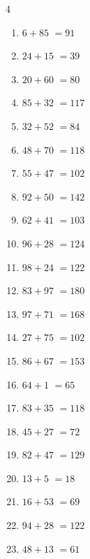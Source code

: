 \begin{multicols}{4}
\begin{enumerate}
  \item $6+85$
        $=91$

  \item $24+15$
        $=39$

  \item $20+60$
        $=80$

  \item $85+32$
        $=117$

  \item $32+52$
        $=84$

  \item $48+70$
        $=118$

  \item $55+47$
        $=102$

  \item $92+50$
        $=142$

  \item $62+41$
        $=103$

  \item $96+28$
        $=124$

  \item $98+24$
        $=122$

  \item $83+97$
        $=180$

  \item $97+71$
        $=168$

  \item $27+75$
        $=102$

  \item $86+67$
        $=153$

  \item $64+1$
        $=65$

  \item $83+35$
        $=118$

  \item $45+27$
        $=72$

  \item $82+47$
        $=129$

  \item $13+5$
        $=18$

\columnbreak %

\resetques

  \item $16+53$
        $=69$

  \item $94+28$
        $=122$

  \item $48+13$
        $=61$


\end{enumerate}
\end{multicols}
